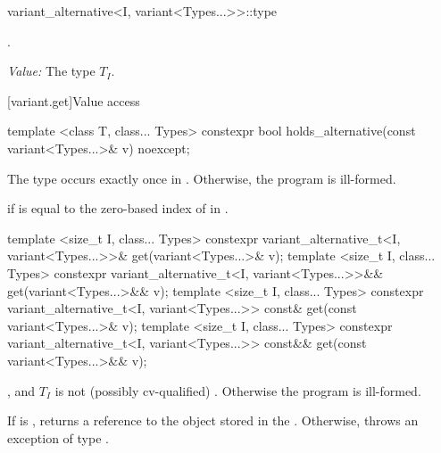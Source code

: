 %
\begin{itemdecl}
variant_alternative<I, variant<Types...>>::type
\end{itemdecl}

\begin{itemdescr}
\pnum
\requires {}.

\pnum
\textit{Value:} The type $T_I$.
\end{itemdescr}

[variant.get]{Value access}

\begin{itemdecl}
template <class T, class... Types>
  constexpr bool holds_alternative(const variant<Types...>& v) noexcept;
\end{itemdecl}

\begin{itemdescr}
\pnum
\requires
The type  occurs exactly once in .
Otherwise, the program is ill-formed.

\pnum
\returns
{} if  is equal to the zero-based index of  in .
\end{itemdescr}

%
\begin{itemdecl}
template <size_t I, class... Types>
  constexpr variant_alternative_t<I, variant<Types...>>& get(variant<Types...>& v);
template <size_t I, class... Types>
  constexpr variant_alternative_t<I, variant<Types...>>&& get(variant<Types...>&& v);
template <size_t I, class... Types>
  constexpr variant_alternative_t<I, variant<Types...>> const& get(const variant<Types...>& v);
template <size_t I, class... Types>
  constexpr variant_alternative_t<I, variant<Types...>> const&& get(const variant<Types...>&& v);
\end{itemdecl}

\begin{itemdescr}
\pnum
\requires
{}, and $T_I$ is not (possibly cv-qualified) .
Otherwise the program is ill-formed.

\pnum
\effects
If  is , returns a reference to the object stored in
the . Otherwise, throws an exception of type .
\end{itemdescr}

